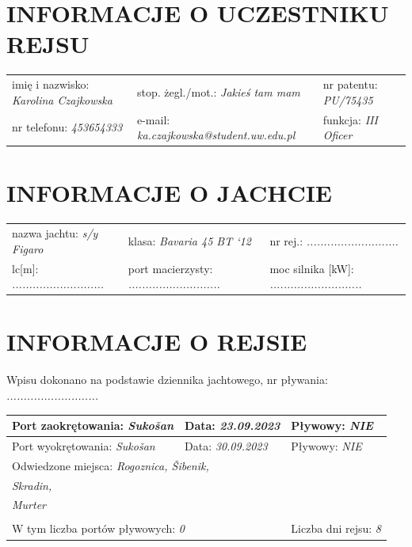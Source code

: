 \documentclass{article}
\begin{document}
\section*{INFORMACJE O UCZESTNIKU REJSU}
\begin{tabularx}{\textwidth}{X X X}
imię i nazwisko: \textit{Karolina Czajkowska} & stop. żegl./mot.: \textit{Jakieś tam mam} & nr patentu: \textit{PU/75435} \\
nr telefonu: \textit{453654333} & e-mail: \textit{ka.czajkowska@student.uw.edu.pl} & funkcja: \textit{III Oficer} \\
\end{tabularx}

\section*{INFORMACJE O JACHCIE}

\begin{tabularx}{\textwidth}{X X X}
nazwa jachtu: \textit{s/y Figaro} & klasa: \textit{Bavaria 45 BT ‘12} & nr rej.: \textit{...........................} \\
lc[m]: \textit{...........................} & port macierzysty: \textit{...........................} & moc silnika [kW]: \textit{...........................} \\
\end{tabularx}

\section*{INFORMACJE O REJSIE}

Wpisu dokonano na podstawie dziennika jachtowego, nr pływania: \textit{...........................}
\\

\begin{tabularx}{\textwidth}{|X|X|X|}
\hline
Port zaokrętowania: \textit{Sukošan} & Data: \textit{23.09.2023} & Pływowy: \textit{NIE} \\
\hline
Port wyokrętowania: \textit{Sukošan} & Data: \textit{30.09.2023} & Pływowy: \textit{NIE} \\
\hline
\multicolumn{3}{|l|}{Odwiedzone miejsca:
\textit{Rogoznica, Šibenik,}\dotfill}\\
\multicolumn{3}{|l|}{\textit{ Skradin,}\dotfill} \\
\multicolumn{3}{|l|}{\textit{ Murter}\dotfill} \\
\multicolumn{3}{|l|}{\dotfill} \\
\hline
\multicolumn{2}{|l|}{W tym liczba portów pływowych: \textit{0}} & Liczba dni rejsu: \textit{8}\\
\hline
\end{tabularx}
\\\\
\end{document}
